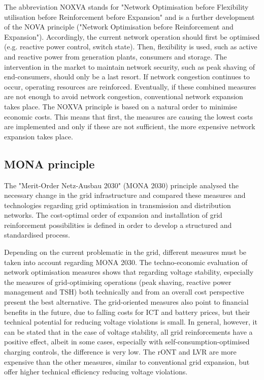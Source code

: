 The abbreviation NOXVA stands for "Network Optimisation before Flexibility utilisation before Reinforcement before Expansion" and is a further development of the NOVA principle ("Network Optimisation before Reinforcement and Expansion"). Accordingly, the current network operation should first be optimised (e.g. reactive power control, switch state). Then, flexibility is used, such as active and reactive power from generation plants, consumers and storage. The intervention in the market to maintain network security, such as peak shaving of end-consumers, should only be a last resort. If network congestion continues to occur, operating resources are reinforced. Eventually, if these combined measures are not enough to avoid network congestion, conventional network expansion takes place. The NOXVA principle is based on a natural order to minimise economic costs. This means that first, the measures are causing the lowest costs are implemented and only if these are not sufficient, the more expensive network expansion takes place.~\cite{noxva} 

\subsection{MONA principle}

The "Merit-Order Netz-Ausbau 2030" (MONA 2030) principle analysed the necessary change in the grid infrastructure and compared these measures and technologies regarding grid optimisation in transmission and distribution networks. The cost-optimal order of expansion and installation of grid reinforcement possibilities is defined in order to develop a structured and standardised process.~\cite{mona}

Depending on the current problematic in the grid, different measures must be taken into account regarding MONA 2030. The techno-economic evaluation of network optimisation measures shows that regarding voltage stability, especially the measures of grid-optimising operations (peak shaving, reactive power management and TSH) both technically and from an overall cost perspective present the best alternative. The grid-oriented measures also point to financial benefits in the future, due to falling costs for ICT and battery prices, but their technical potential for reducing voltage violations is small. In general, however, it can be stated that in the case of voltage stability, all grid reinforcements have a positive effect, albeit in some cases, especially with self-consumption-optimised charging controls, the difference is very low. The rONT and LVR are more expensive than the other measures, similar to conventional grid expansion, but offer higher technical efficiency reducing voltage violations.~\cite{mona} 

